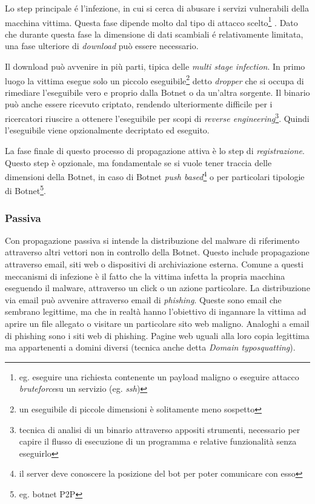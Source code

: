 Lo step principale é l'infezione, in cui si cerca di abusare i  servizi vulnerabili della macchina vittima. Questa fase dipende molto dal tipo di attacco scelto\footnote{eg. eseguire una richiesta contenente un payload maligno o eseguire attacco \textit{bruteforce}\footnotemark su un servizio (eg. \textit{ssh})}
.
Dato che durante questa fase la dimensione di dati scambiali é relativamente limitata, una fase ulteriore di \emph{download} può essere necessario.


\label{Download}Il download può avvenire in più parti, tipica delle \emph{multi stage infection}. In primo luogo la vittima esegue solo un piccolo eseguibile\footnote{un eseguibile di piccole dimensioni è solitamente meno sospetto} detto \emph{dropper} che si occupa di rimediare l'eseguibile vero e proprio dalla Botnet o da un'altra sorgente. Il binario può anche essere ricevuto criptato, rendendo ulteriormente difficile per i ricercatori riuscire a ottenere l'eseguibile per scopi di \emph{reverse engineering}\footnote{tecnica di analisi di un binario attraverso appositi strumenti, necessario per capire il flusso di esecuzione di un programma e relative funzionalità senza eseguirlo}. Quindi l'eseguibile viene opzionalmente decriptato ed eseguito.

La fase finale di questo processo di propagazione attiva è lo step di \emph{registrazione}.
Questo step è opzionale, ma fondamentale se si vuole tener traccia delle dimensioni della Botnet, in caso di Botnet \emph{push based}\footnote{il server deve conoscere la posizione del bot per poter comunicare con esso} o per particolari tipologie di Botnet\footnote{eg. botnet P2P}.

\subsubsection{Passiva}
Con propagazione passiva si intende la distribuzione del malware di riferimento attraverso altri vettori non in controllo della Botnet. Questo include propagazione attraverso email, siti web o dispositivi di archiviazione esterna. Comune a questi meccanismi di infezione è il fatto che la vittima infetta la propria macchina eseguendo il malware, attraverso un click o un azione particolare. 
La distribuzione via email può avvenire attraverso email di \emph{phishing}. Queste sono email che sembrano legittime, ma che in realtà hanno l'obiettivo di ingannare la vittima ad aprire un file allegato o visitare un particolare sito web maligno. Analoghi a email di phishing sono i siti web di phishing. Pagine web uguali alla loro copia legittima ma appartenenti a domini diversi (tecnica anche detta \emph{Domain typosquatting}).

